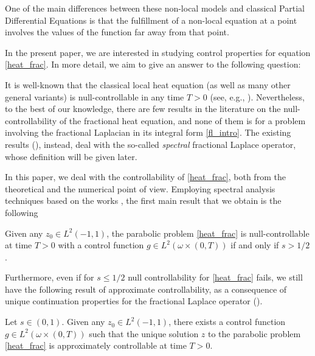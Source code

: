 One of the main differences between these non-local models and classical Partial Differential Equations is that the fulfillment of a non-local equation at a point involves the values of the function far away from that point.

In the present paper, we are interested in studying control properties for equation \eqref{heat_frac}. In more detail, we aim to give an answer to the following question:


It is well-known that the classical local heat equation (as well as many other general variants) is null-controllable in any time $T>0$ (see, e.g., \cite{fattorini1971exact,fursikov1996controllability,lebeau1995controle}). Nevertheless, to the best of our knowledge, there are few results in the literature on the null-controllability of the fractional heat equation, and none of them is for a problem involving the fractional Laplacian in its integral form \eqref{fl_intro}. The existing results (\cite{micu2006controllability,miller2006controllability}), instead, deal with the so-called \textit{spectral} fractional Laplace operator, whose definition will be given later. 

In this paper, we deal with the controllability of \eqref{heat_frac}, both from the theoretical and the numerical point of view. Employing spectral analysis techniques based on the works \cite{kulczycki2010spectral,kwasnicki2012eigenvalues}, the first main result that we obtain is the following

\begin{theorem}\label{null_control_thm}
Given any $z_0\in L^2(-1,1)$, the parabolic problem \eqref{heat_frac} is null-controllable at time $T>0$ with a control function $g\in L^2(\omega\times(0,T))$ if and only if $s>1/2$.  
\end{theorem}

Furthermore, even if for $s\leq 1/2$ null controllability for \eqref{heat_frac} fails, we still have the following result of approximate controllability, as a consequence of unique continuation properties for the fractional Laplace operator (\cite{fall2014unique}). 

\begin{theorem}\label{approx_control_thm}
Let $s\in(0,1)$. Given any $z_0\in L^2(-1,1)$, there exists a control function $g\in L^2(\omega\times(0,T))$ such that the unique solution $z$ to the parabolic problem \eqref{heat_frac} is approximately controllable at time $T>0$.
\end{theorem}

